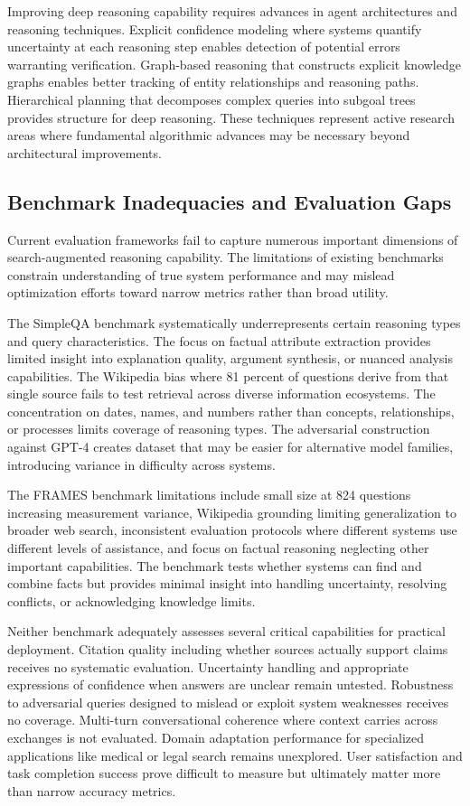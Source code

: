 Improving deep reasoning capability requires advances in agent architectures and reasoning techniques. Explicit confidence modeling where systems quantify uncertainty at each reasoning step enables detection of potential errors warranting verification. Graph-based reasoning that constructs explicit knowledge graphs enables better tracking of entity relationships and reasoning paths. Hierarchical planning that decomposes complex queries into subgoal trees provides structure for deep reasoning. These techniques represent active research areas where fundamental algorithmic advances may be necessary beyond architectural improvements.

\subsection{Benchmark Inadequacies and Evaluation Gaps}

Current evaluation frameworks fail to capture numerous important dimensions of search-augmented reasoning capability. The limitations of existing benchmarks constrain understanding of true system performance and may mislead optimization efforts toward narrow metrics rather than broad utility.

The SimpleQA benchmark systematically underrepresents certain reasoning types and query characteristics. The focus on factual attribute extraction provides limited insight into explanation quality, argument synthesis, or nuanced analysis capabilities. The Wikipedia bias where 81 percent of questions derive from that single source fails to test retrieval across diverse information ecosystems. The concentration on dates, names, and numbers rather than concepts, relationships, or processes limits coverage of reasoning types. The adversarial construction against GPT-4 creates dataset that may be easier for alternative model families, introducing variance in difficulty across systems.

The FRAMES benchmark limitations include small size at 824 questions increasing measurement variance, Wikipedia grounding limiting generalization to broader web search, inconsistent evaluation protocols where different systems use different levels of assistance, and focus on factual reasoning neglecting other important capabilities. The benchmark tests whether systems can find and combine facts but provides minimal insight into handling uncertainty, resolving conflicts, or acknowledging knowledge limits.

Neither benchmark adequately assesses several critical capabilities for practical deployment. Citation quality including whether sources actually support claims receives no systematic evaluation. Uncertainty handling and appropriate expressions of confidence when answers are unclear remain untested. Robustness to adversarial queries designed to mislead or exploit system weaknesses receives no coverage. Multi-turn conversational coherence where context carries across exchanges is not evaluated. Domain adaptation performance for specialized applications like medical or legal search remains unexplored. User satisfaction and task completion success prove difficult to measure but ultimately matter more than narrow accuracy metrics.


